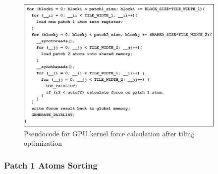 \begin{figure}[h]
\centering
\setlength{\abovecaptionskip}{-1pt}
\setlength{\belowcaptionskip}{-2pt}
\includegraphics[width=4.0in]{figs/pseudocode-tile.eps}
\caption{Pseudocode for GPU kernel force calculation after tiling optimization}
\label{figs:pseudocode-tile}
\end{figure}

\subsubsection{Patch 1 Atoms Sorting}
